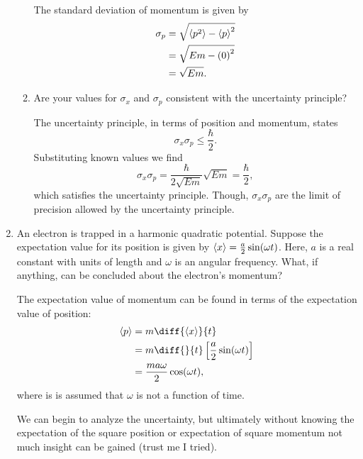 \documentclass[a4paper, 12pt]{config/homework}
\begin{document}
\begin{enumerate}
\begin{enumerate}[label = (\alph*)]
The standard deviation of momentum is given by
\begin{align*}
\sigma_p &= \sqrt{\braket{p^2} - \braket{p}^2}
\\&= \sqrt{Em - {\left(0\right)}^2}
\\&= \sqrt{Em}.
\end{align*}

\item Are your values for \(\sigma_x\) and \(\sigma_p\) consistent with the uncertainty principle?

The uncertainty principle, in terms of position and momentum, states
\[\sigma_x \sigma_p \le \frac{\hbar}{2}.\]
Substituting known values we find
\[\sigma_x \sigma_p = \frac{\hbar}{2 \sqrt{Em}} \sqrt{Em} = \frac{\hbar}{2},\]
which satisfies the uncertainty principle. Though, \(\sigma_x \sigma_p\) are the limit of precision allowed by the uncertainty principle.
\end{enumerate}

\pagebreak
\item An electron is trapped in a harmonic quadratic potential. Suppose the expectation value for its position is given by \(\braket{x} = \frac{a}{2}\sin(\omega t)\). Here, \(a\) is a real constant with units of length and \(\omega \) is an angular frequency. What, if anything, can be concluded about the electron's momentum?

The expectation value of momentum can be found in terms of the expectation value of position:
\begin{align*}
\braket{p} &= m \diff{\braket{x}}{t}
\\&= m \diff{}{t}\left[\frac{a}{2}\sin(\omega t)\right]
\\&= \frac{ma \omega}{2} \cos(\omega t),
\end{align*}
where is is assumed that \(\omega \) is not a function of time.

We can begin to analyze the uncertainty, but ultimately without knowing the expectation of the square position or expectation of square momentum not much insight can be gained (trust me I tried).

\end{enumerate}
\end{document}
